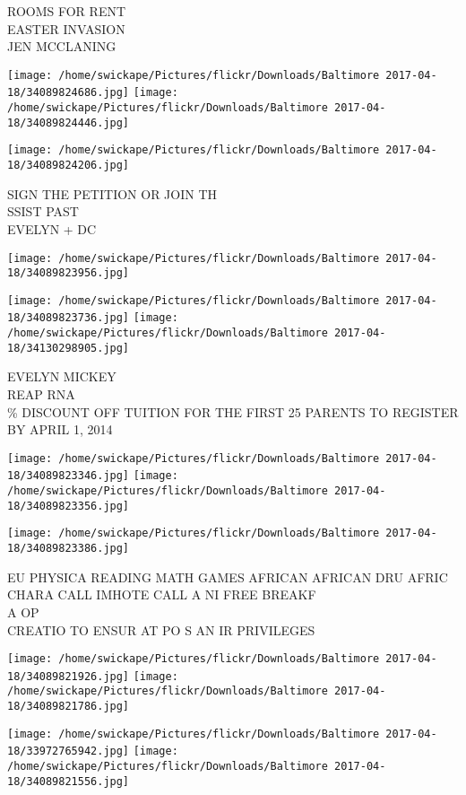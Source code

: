 \documentclass[10pt,letterpaper]{article}
\begin{document}
ROOMS FOR RENT\\
EASTER INVASION\\
JEN MCCLANING
\pagebreak

\texttt{[image: /home/swickape/Pictures/flickr/Downloads/Baltimore 2017-04-18/34089824686.jpg]}
\texttt{[image: /home/swickape/Pictures/flickr/Downloads/Baltimore 2017-04-18/34089824446.jpg]}

\texttt{[image: /home/swickape/Pictures/flickr/Downloads/Baltimore 2017-04-18/34089824206.jpg]}

SIGN THE PETITION OR JOIN TH\\
SSIST PAST\\
EVELYN + DC
\pagebreak

\texttt{[image: /home/swickape/Pictures/flickr/Downloads/Baltimore 2017-04-18/34089823956.jpg]}

\vspace{0.25in}
\texttt{[image: /home/swickape/Pictures/flickr/Downloads/Baltimore 2017-04-18/34089823736.jpg]}
\texttt{[image: /home/swickape/Pictures/flickr/Downloads/Baltimore 2017-04-18/34130298905.jpg]}

EVELYN MICKEY\\
REAP RNA\\
\% DISCOUNT OFF TUITION FOR THE FIRST 25 PARENTS TO REGISTER BY APRIL 1, 2014
\pagebreak

\texttt{[image: /home/swickape/Pictures/flickr/Downloads/Baltimore 2017-04-18/34089823346.jpg]}
\texttt{[image: /home/swickape/Pictures/flickr/Downloads/Baltimore 2017-04-18/34089823356.jpg]}

\vspace{0.25in}
\texttt{[image: /home/swickape/Pictures/flickr/Downloads/Baltimore 2017-04-18/34089823386.jpg]}

EU PHYSICA READING MATH GAMES AFRICAN AFRICAN DRU AFRIC CHARA CALL IMHOTE CALL A NI FREE BREAKF\\
A OP\\
CREATIO TO ENSUR AT PO S AN IR PRIVILEGES
\pagebreak

\texttt{[image: /home/swickape/Pictures/flickr/Downloads/Baltimore 2017-04-18/34089821926.jpg]}
\texttt{[image: /home/swickape/Pictures/flickr/Downloads/Baltimore 2017-04-18/34089821786.jpg]}

\texttt{[image: /home/swickape/Pictures/flickr/Downloads/Baltimore 2017-04-18/33972765942.jpg]}
\texttt{[image: /home/swickape/Pictures/flickr/Downloads/Baltimore 2017-04-18/34089821556.jpg]}
\end{document}

